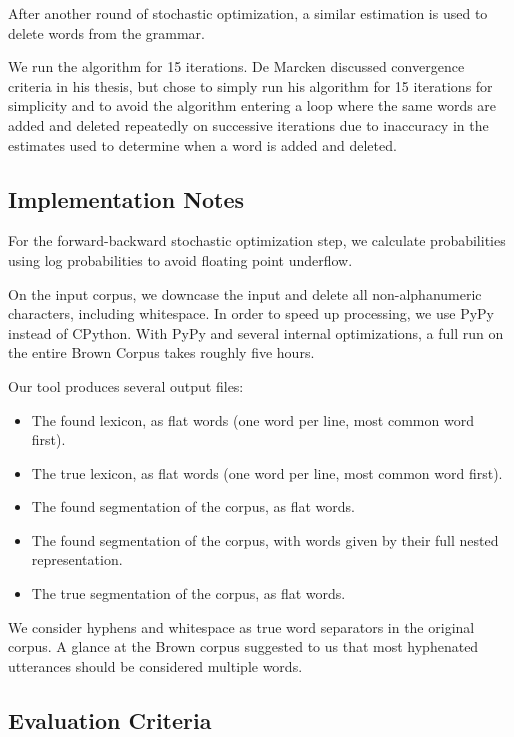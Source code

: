 \documentclass[11pt, oneside, fleqn]{article}
\begin{document}
  After another round of stochastic optimization, a similar estimation is used to delete words from the grammar. 
  
  We run the algorithm for 15 iterations. De Marcken discussed convergence criteria in his thesis, but chose to simply run his algorithm for 15 iterations for simplicity and to avoid the algorithm entering a loop where the same words are added and deleted repeatedly on successive iterations due to inaccuracy in the estimates used to determine when a word is added and deleted.
  
  \subsection{Implementation Notes}
  
  For the forward-backward stochastic optimization step, we calculate probabilities using log probabilities to avoid floating point underflow.

  On the input corpus, we downcase the input and delete all non-alphanumeric characters, including whitespace. In order to speed up processing, we use PyPy instead of CPython. With PyPy and several internal optimizations, a full run on the entire Brown Corpus takes roughly five hours.
  
  Our tool produces several output files:

  \begin{itemize}
    \item The found lexicon, as flat words (one word per line, most common word first).
    \item The true lexicon, as flat words (one word per line, most common word first).
    \item The found segmentation of the corpus, as flat words.
    \item The found segmentation of the corpus, with words given by their full nested representation.
    \item The true segmentation of the corpus, as flat words. 
  \end{itemize}

	We consider hyphens and whitespace as true word separators in the original corpus. A glance at the Brown corpus suggested to us that most hyphenated utterances should be considered multiple words.

  \subsection{Evaluation Criteria}
\end{document}
